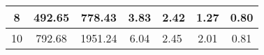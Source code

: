 \begin{table}
{\begin{tabular}{|c|c|c|c|l|c|c|}
8                                                                                          & 492.65                                                                                                                                                                                                                       & 778.43                                                                                                                                                                                                                       & 3.83                                                                                                                     & 2.42                                                                                                                                              & 1.27                                                                                & 0.80                                                                                   \\ \hline
10                                                                                         & 792.68                                                                                                                                                                                                                       & 1951.24                                                                                                                                                                                                                      & 6.04                                                                                                                     & 2.45                                                                                                                                              & 2.01                                                                                & 0.81                                                                                   \\ \hline
\end{tabular}}
\end{table}

